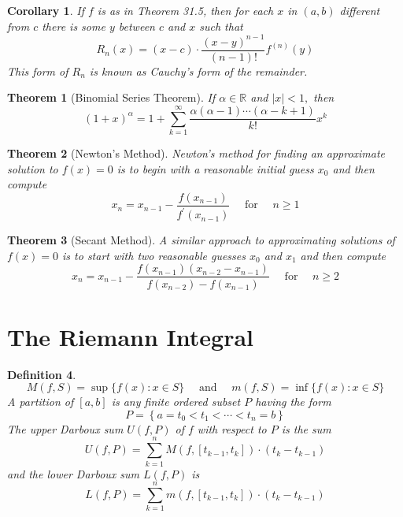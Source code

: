 \documentclass[12pt]{article}
\newtheorem{theorem}{Theorem}[section]
\newtheorem{corollary}{Corollary}[theorem]
\newtheorem{definition}[theorem]{Definition}
\begin{document}
\begin{corollary}
	If $f$ is as in Theorem 31.5, then for each $x$ in $( a , b )$ different from $c$
	there is some $y$ between $c$ and $x$ such that $$
	R _ { n } ( x ) = ( x - c ) \cdot \frac { ( x - y ) ^ { n - 1 } } { ( n - 1 ) ! } f ^ { ( n ) } ( y )
	$$ This form of $R _ { n }$ is known as Cauchy's form of the remainder.
\end{corollary}

\begin{theorem}[Binomial Series Theorem]
	If $\alpha \in \mathbb { R }$ and $| x | < 1 ,$ then $$
	( 1 + x ) ^ { \alpha } = 1 + \sum _ { k = 1 } ^ { \infty } \frac { \alpha ( \alpha - 1 ) \cdots ( \alpha - k + 1 ) } { k ! } x ^ { k }
	$$
\end{theorem}

\begin{theorem}[Newton's Method]
	Newton's method for finding an approximate solution to $f ( x ) = 0$ is
	to begin with a reasonable initial guess $x _ { 0 }$ and then compute
	$$
	x _ { n } = x _ { n - 1 } - \frac { f \left( x _ { n - 1 } \right) } { f ^ { \prime } \left( x _ { n - 1 } \right) } \quad \text { for } \quad n \geq 1
	$$
\end{theorem}


\begin{theorem}[Secant Method]
	A similar approach to approximating solutions of $f ( x ) = 0$ is to start
	with two reasonable guesses $x _ { 0 }$ and $x _ { 1 }$ and then compute
	$$
	x _ { n } = x _ { n - 1 } - \frac { f \left( x _ { n - 1 } \right) \left( x _ { n - 2 } - x _ { n - 1 } \right) } { f \left( x _ { n - 2 } \right) - f \left( x _ { n - 1 } \right) } \quad \text { for } \quad n \geq 2
	$$
\end{theorem}
\section{The Riemann Integral}
\begin{definition}
	$$
	M ( f , S ) = \sup \{ f ( x ) : x \in S \} \quad \text { and } \quad m ( f , S ) = \inf \{ f ( x ) : x \in S \}
	$$
	A partition of $[ a , b ]$ is any finite ordered subset $P$ having the form $$
	P = \left\{ a = t _ { 0 } < t _ { 1 } < \cdots < t _ { n } = b \right\}
	$$
	The upper Darboux sum $U ( f , P )$ of $f$ with respect to $P$ is the sum $$
	U ( f , P ) = \sum _ { k = 1 } ^ { n } M \left( f , \left[ t _ { k - 1 } , t _ { k } \right] \right) \cdot \left( t _ { k } - t _ { k - 1 } \right)
	$$ and the lower Darboux sum $L ( f , P )$ is $$
	L ( f , P ) = \sum _ { k = 1 } ^ { n } m \left( f , \left[ t _ { k - 1 } , t _ { k } \right] \right) \cdot \left( t _ { k } - t _ { k - 1 } \right)
	$$
\end{definition}
\end{document}
